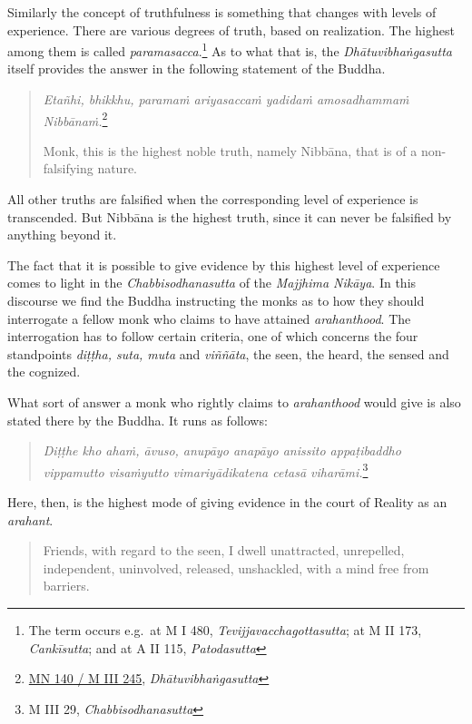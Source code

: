 Similarly the concept of truthfulness is something that changes with levels of experience. There are various degrees of truth, based on realization. The highest among them is called \emph{paramasacca}.\footnote{The term occurs e.g.~at M I 480, \emph{Tevijjavacchagottasutta}; at M II 173, \emph{Cankīsutta}; and at A II 115, \emph{Patodasutta}} As to what that is, the \emph{Dhātuvibhaṅgasutta} itself provides the answer in the following statement of the Buddha.

\begin{quote}
\emph{Etañhi, bhikkhu, paramaṁ ariyasaccaṁ yadidaṁ amosadhammaṁ Nibbānaṁ.}\footnote{\href{https://suttacentral.net/mn140/pli/ms}{MN 140 / M III 245}, \emph{Dhātuvibhaṅgasutta}}

Monk, this is the highest noble truth, namely Nibbāna, that is of a non-falsifying nature.
\end{quote}

All other truths are falsified when the corresponding level of experience is transcended. But Nibbāna is the highest truth, since it can never be falsified by anything beyond it.

The fact that it is possible to give evidence by this highest level of experience comes to light in the \emph{Chabbisodhanasutta} of the \emph{Majjhima Nikāya}. In this discourse we find the Buddha instructing the monks as to how they should interrogate a fellow monk who claims to have attained \emph{arahanthood}. The interrogation has to follow certain criteria, one of which concerns the four standpoints \emph{diṭṭha, suta, muta} and \emph{viññāta}, the seen, the heard, the sensed and the cognized.

What sort of answer a monk who rightly claims to \emph{arahanthood} would give is also stated there by the Buddha. It runs as follows:

\begin{quote}
\emph{Diṭṭhe kho ahaṁ, āvuso, anupāyo anapāyo anissito appaṭibaddho vippamutto visaṁyutto vimariyādikatena cetasā viharāmi.}\footnote{M III 29, \emph{Chabbisodhanasutta}}
\end{quote}

Here, then, is the highest mode of giving evidence in the court of Reality as an \emph{arahant}.

\begin{quote}
Friends, with regard to the seen, I dwell unattracted, unrepelled, independent, uninvolved, released, unshackled, with a mind free from barriers.
\end{quote}

